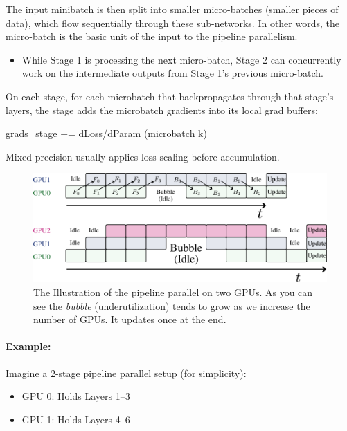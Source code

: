 {The input minibatch is then split into smaller micro-batches (smaller pieces of data), which flow sequentially through these sub-networks. In other words, the micro-batch is the basic unit of the input to the pipeline parallelism. 
\begin{itemize}
	\item While Stage 1 is processing the next micro-batch, Stage 2 can concurrently work on the intermediate outputs from Stage 1's previous micro-batch.
\end{itemize}

On each stage, for each microbatch that backpropagates through that stage's layers, the stage adds the microbatch gradients into its local grad buffers:

\begin{center}
	grads\_stage += dLoss/dParam (microbatch k)
\end{center}
Mixed precision usually applies loss scaling before accumulation.

\begin{figure}[t]
	\centering
	\includegraphics[scale=0.8]{./images/pipeline.pdf}
	\caption{The Illustration of the pipeline parallel on two GPUs. As you can see the \textit{bubble} (\ie underutilization) tends to grow as we increase the number of GPUs. It updates once at the end.}
\end{figure}

\paragraph{Example:} Imagine a 2-stage pipeline parallel setup (for simplicity):

\begin{itemize}
	\item GPU 0: Holds Layers 1–3  
	\item GPU 1: Holds Layers 4–6  
\end{itemize}

}
